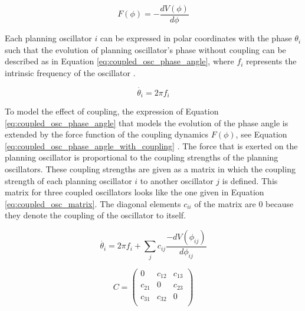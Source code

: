 \begin{equation}
F(\phi) = -\frac{dV(\phi)}{d\phi}
\label{eq:coupled_osc_force}
\end{equation}

Each planning oscillator $i$ can be expressed in polar coordinates with the phase $\theta_i$ such that the evolution of planning oscillator's phase without coupling can be described as in Equation \ref{eq:coupled_osc_phase_angle}, where $f_i$ represents the intrinsic frequency of the oscillator \citep{Tilsen2018}.

\begin{equation}
\dot{\theta_i} =  2 \pi f_i
\label{eq:coupled_osc_phase_angle}
\end{equation}

To model the effect of coupling, the expression of Equation \ref{eq:coupled_osc_phase_angle} that models the evolution of the phase angle is extended by the force function of the coupling dynamics $F(\phi)$, see Equation \ref{eq:coupled_osc_phase_angle_with_coupling} \citep{Tilsen2017}. The force that is exerted on the planning oscillator is proportional to the coupling strengths of the planning oscillators. These coupling strengths are given as a matrix in which the coupling strength of each planning oscillator $i$ to another oscillator $j$ is defined. This matrix for three coupled oscillators looks like the one given in Equation \ref{eq:coupled_osc_matrix}. The diagonal elements $c_{ii}$ of the matrix are $0$ because they denote the coupling of the oscillator to itself.

\begin{equation}
\dot{\theta_i} =  2 \pi f_i + \sum_j{ c_{ij} \frac{-dV(\phi_{ij})}{d\phi_{ij}}}
\label{eq:coupled_osc_phase_angle_with_coupling}
\end{equation}

\begin{equation}
C = 
\begin{pmatrix}
0 & c_{12} & c_{13} \\
c_{21} & 0 & c_{23} \\
c_{31} & c_{32} & 0 \\
\end{pmatrix}
\label{eq:coupled_osc_matrix}
\end{equation}

